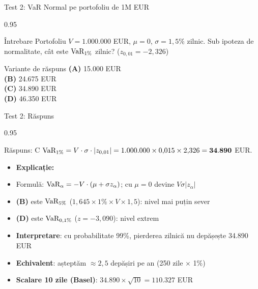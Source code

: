 \documentclass[9pt, aspectratio=169, t]{beamer}
\begin{document}
\begin{frame}[shrink=10]{Test 2: VaR Normal pe portofoliu de 1M EUR}
\begin{cminipage}{0.95\textwidth}
    \begin{alertblock}{Întrebare}
    Portofoliu $V = 1.000.000$ EUR, $\mu = 0$, $\sigma = 1{,}5\%$ zilnic.
    Sub ipoteza de normalitate, cât este $\text{VaR}_{1\%}$ zilnic?
    ($z_{0{,}01} = -2{,}326$)
    \end{alertblock}
    \vspace{0.4cm}
    \begin{block}{Variante de răspuns}
    \textcolor{MainBlue}{\textbf{(A)}} 15.000 EUR \\[3pt]
    \textcolor{MainBlue}{\textbf{(B)}} 24.675 EUR \\[3pt]
    \textcolor{MainBlue}{\textbf{(C)}} 34.890 EUR \\[3pt]
    \textcolor{MainBlue}{\textbf{(D)}} 46.350 EUR
    \end{block}
\end{cminipage}
\end{frame}

\begin{frame}[shrink=10]{Test 2: Răspuns}
\begin{cminipage}{0.95\textwidth}
    \begin{exampleblock}{Răspuns: C}
    $\text{VaR}_{1\%} = V \cdot \sigma \cdot |z_{0{,}01}| = 1.000.000 \times 0{,}015 \times 2{,}326 = \mathbf{34.890}$ EUR.
    \end{exampleblock}
    \vspace{0.2cm}
    \begin{itemize}\setlength{\itemsep}{0pt}
        \item \textbf{Explicație:}
        \item Formulă: $\text{VaR}_\alpha = -V \cdot (\mu + \sigma z_\alpha)$; cu $\mu = 0$ devine $V \sigma |z_\alpha|$
        \item \textbf{(B)} este $\text{VaR}_{5\%}$ ($1{,}645 \times 1\% \times V \times 1{,}5$): nivel mai puțin sever
        \item \textbf{(D)} este $\text{VaR}_{0{,}1\%}$ ($z = -3{,}090$): nivel extrem
        \item \textbf{Interpretare}: cu probabilitate 99\%, pierderea zilnică nu depășește 34.890 EUR
        \item \textbf{Echivalent}: așteptăm $\approx 2{,}5$ depășiri pe an (250 zile $\times$ 1\%)
        \item \textbf{Scalare 10 zile (Basel)}: $34.890 \times \sqrt{10} = 110.327$ EUR
    \end{itemize}
\end{cminipage}
\end{frame}
\end{document}
